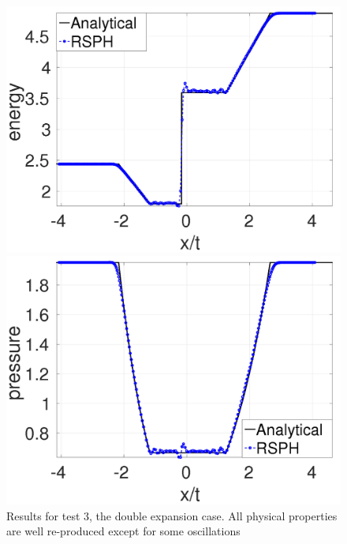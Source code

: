 \documentclass[review]{elsarticle}
\begin{document}
\begin{figure}[H]
\begin{minipage}{.415\textwidth}
        \includegraphics[width=0.99 \textwidth]{./Figures/Dexp-RCM-e}
    \end{minipage}%
    \begin{minipage}{.415 \textwidth}
        \centering
        \includegraphics[width=0.99 \textwidth]{./Figures/Dexp-RCM-p}
    \end{minipage}%
    \caption{Results for test 3, the double expansion case. All physical properties are well re-produced except for some oscillations}
    \label{fig:RCM-double-expansion}
\end{figure}
\end{document}
